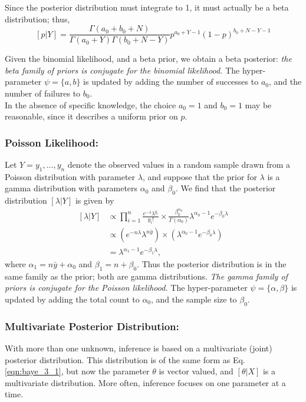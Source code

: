 \documentclass[12pt,oneside,a4paper]{book}
\theoremstyle{definition}
\theoremstyle{remark}
\begin{document}
					Since the posterior distribution must integrate to 1, it must actually be a beta distribution; thus,
					\[
						[p|Y] = \frac{\Gamma(a_0+b_0+N)}{\Gamma(a_0+Y)\Gamma(b_0+N-Y)}p^{a_0+Y-1}(1-p)^{b_0+N-Y-1}
					\]

					Given the binomial likelihood, and a beta prior, we obtain a beta posterior: \textit{the beta family of priors is conjugate for the binomial likelihood.} The hyper-parameter $\psi = \{ a,b\}$ is updated by adding the number of successes to $a_0$, and the number of failures to $b_0$.\\
					In the absence of specific knowledge, the choice $a_0 = 1$ and $b_0 = 1$ may be reasonable, since it describes a uniform prior on $p$. \cite{link2009bayesian}

				\subsubsection{Poisson Likelihood:}
					Let $Y = { y_1,. . . ,y_n}$ denote the observed values in a random sample drawn from a Poisson distribution with parameter $\lambda$, and suppose that the prior for $\lambda$ is a gamma distribution with parameters $\alpha_0$ and $\beta_0$. We find that the posterior distribution $[\lambda|Y ]$ is given by
					\begin{equation*}
						\begin{aligned}
							[\lambda|Y] &\propto \prod_{i=1}^{n}\frac{e^{-\lambda}\lambda^{y_i}}{y_i!} \times \frac{\beta^{\alpha_0}_0}{\Gamma(\alpha_0)}\lambda^{\alpha_0 -1}e^{-\beta_0\lambda}\\
							&\propto (e^{-n\lambda}\lambda^{n\bar{y}})\times (\lambda^{\alpha_0-1}e^{-\beta_0\lambda})\\
							&=\lambda^{\alpha_1-1}e^{-\beta_1\lambda},
						\end{aligned}
					\end{equation*}
					where $\alpha_1 = n\bar{y}+\alpha_0$ and $\beta_1=n+\beta_0$.
					Thus the posterior distribution is in the same family as the prior; both are gamma distributions. \textit{The gamma family of priors is conjugate for the Poisson likelihood.} The hyper-parameter $\psi = \{ \alpha,\beta \}$	is updated by adding the total count to $\alpha_0$, and the sample size to $\beta_0$. \cite{link2009bayesian}


				\subsubsection{ Multivariate Posterior Distribution:}
					With more than one unknown, inference is based on a multivariate (joint) posterior distribution. This distribution is of the same form as Eq. \eqref{eqn:baye_3_1}, but now the parameter $\theta$ is vector valued, and $[\theta|X]$ is a multivariate distribution. More often, inference focuses on one parameter at a time.\\
\end{document}
